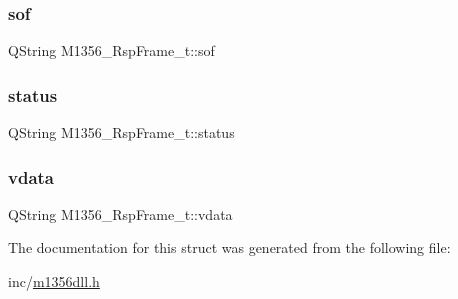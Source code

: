 \subsubsection{\texorpdfstring{sof}{sof}}
{\footnotesize\ttfamily Q\+String M1356\+\_\+\+Rsp\+Frame\+\_\+t\+::sof}

\mbox{\label{struct_m1356___rsp_frame__t_a8a97971b3dadcb42f1f9ca0c7a0148de}} 
\subsubsection{\texorpdfstring{status}{status}}
{\footnotesize\ttfamily Q\+String M1356\+\_\+\+Rsp\+Frame\+\_\+t\+::status}

\mbox{\label{struct_m1356___rsp_frame__t_aebced86ccafc1bd99e72bce2dcc0d6c4}} 
\subsubsection{\texorpdfstring{vdata}{vdata}}
{\footnotesize\ttfamily Q\+String M1356\+\_\+\+Rsp\+Frame\+\_\+t\+::vdata}



The documentation for this struct was generated from the following file\+:\begin{DoxyCompactItemize}
\item 
inc/\mbox{\hyperlink{inc_2m1356dll_8h}{m1356dll.\+h}}\end{DoxyCompactItemize}

